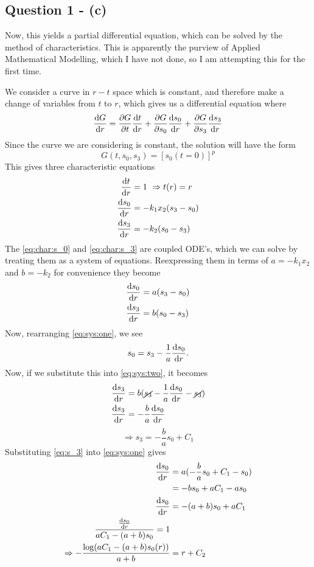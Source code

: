 \documentclass[11pt,a4paper]{article}
\begin{document}
\subsection{Question 1 - (c)}
\label{sec:question1:subsec:partc}
Now, this yields a partial differential equation, which can be solved by the method of characteristics. This is apparently the purview of Applied Mathematical Modelling, which I have not done, so I am attempting this for the first time. 
\par We consider a curve in $r-t$ space which is constant, and therefore make a change of variables from $t$ to $r$, which gives us a differential equation where
$$ \dv{G}{r} = \pdv{G}{t} \dv{t}{r} + \pdv{G}{s_0} \dv{s_0}{r} + \pdv{G}{s_3} \dv{s_3}{r} $$
Since the curve we are considering is constant, the solution will have the form
$$ G(t,s_0,s_3) = [s_0(t=0)]^p $$
This gives three characteristic equations 
\begin{align}
\dv{t}{r} &= 1 \ \Rightarrow t(r) = r \label{eq:char:t} \\ 
\dv{s_0}{r} &= - k_1 x_2 (s_3 - s_0) \label{eq:char:s_0} \\
\dv{s_3}{r} &= - k_2 (s_0 - s_3)  \label{eq:char:s_3}
\end{align}
The \eqref{eq:char:s_0} and \eqref{eq:char:s_3} are coupled ODE's, which we can solve by treating them as a system of equations. Reexpressing them in terms of $a = - k_1 x_2 $ and $b= -k_2$ for convenience they become
\begin{align}
\dv{s_0}{r} &= a (s_3 - s_0) \label{eq:sys:one} \\
\dv{s_3}{r} &= b (s_0 - s_3) \label{eq:sys:two}
\end{align} 
Now, rearranging \eqref{eq:sys:one}, we see
\begin{equation}\label{eq:s_0}
s_0 = s_3 - \frac{1}{a} \dv{s_0}{r} .
\end{equation}
Now, if we substitute this into \eqref{eq:sys:two}, it becomes 
\begin{align*}
\dv{s_3}{r} &= b( \cancel{s_3} - \frac{1}{a} \dv{s_0}{r} - \cancel{s_3} ) \\
\dv{s_3}{r} &= - \frac{b}{a} \dv{s_0}{r} \\
\end{align*}
\begin{equation}\label{eq:s_3}
\Rightarrow s_3 = -\frac{b}{a} s_0 + C_1 
\end{equation}
Substituting \eqref{eq:s_3} into \eqref{eq:sys:one} gives
\begin{align*}
\dv{s_0}{r} &= a (- \frac{b}{a} s_0 + C_1 - s_0) \\
&= - b s_0 + a C_1 - a s_0 \\
\dv{s_0}{r} &= - (a+b) s_0 + a C_1 \\
\frac{\dv{s_0}{r}}{a C_1 - (a+b) s_0} = 1 \\
\Rightarrow - \frac{\log(a C_1 - (a+b) s_0(r)) }{a+b} &= r + C_2 \\ 
\end{align*}
\end{document}
